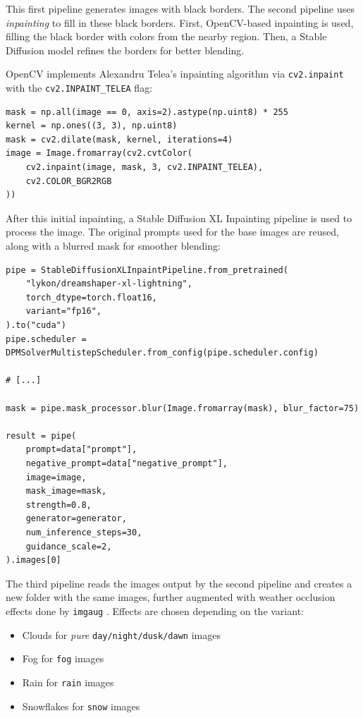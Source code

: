 This first pipeline generates images with black borders. 
The second pipeline uses \emph{inpainting} to fill in these black borders. 
First, OpenCV-based inpainting is used, filling the black border with colors from the nearby region. 
Then, a Stable Diffusion model refines the borders for better blending.

OpenCV implements Alexandru Telea's inpainting algorithm \cite{telea_image_2004}
via \texttt{cv2.inpaint} with the \texttt{cv2.INPAINT\_TELEA} flag:

\begin{lstlisting}
mask = np.all(image == 0, axis=2).astype(np.uint8) * 255
kernel = np.ones((3, 3), np.uint8)
mask = cv2.dilate(mask, kernel, iterations=4)
image = Image.fromarray(cv2.cvtColor(
    cv2.inpaint(image, mask, 3, cv2.INPAINT_TELEA),
    cv2.COLOR_BGR2RGB
))
\end{lstlisting}

After this initial inpainting, a Stable Diffusion XL Inpainting pipeline is used to process the image. 
The original prompts used for the base images are reused, along with a blurred mask for smoother blending:

\begin{lstlisting}
pipe = StableDiffusionXLInpaintPipeline.from_pretrained(
    "lykon/dreamshaper-xl-lightning",
    torch_dtype=torch.float16,
    variant="fp16",
).to("cuda")
pipe.scheduler = DPMSolverMultistepScheduler.from_config(pipe.scheduler.config)

# [...]

mask = pipe.mask_processor.blur(Image.fromarray(mask), blur_factor=75)

result = pipe(
    prompt=data["prompt"],
    negative_prompt=data["negative_prompt"],
    image=image,
    mask_image=mask,
    strength=0.8,
    generator=generator,
    num_inference_steps=30,
    guidance_scale=2,
).images[0]
\end{lstlisting}

The third pipeline reads the images output by the second pipeline and creates a new folder with the same images, further augmented with weather occlusion effects done by \texttt{imgaug} \cite{jung_imgaug_2020}. 
Effects are chosen depending on the variant:

\begin{itemize}
\item Clouds for \emph{pure} \texttt{day/night/dusk/dawn} images
\item Fog for \texttt{fog} images
\item Rain for \texttt{rain} images
\item Snowflakes for \texttt{snow} images
\end{itemize}

